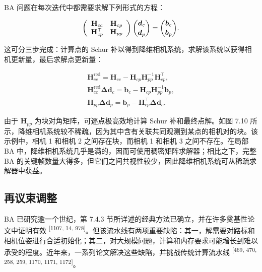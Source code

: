 BA 问题在每次迭代中都需要求解下列形式的方程：

\begin{equation*}
\left( \begin{array}{c c} \mathbf {H} _ {c c} & \mathbf {H} _ {c p} \\ \mathbf {H} _ {c p} ^ {\top} & \mathbf {H} _ {p p} \end{array} \right) \binom{\boldsymbol {d} _ {c}}{\boldsymbol {d} _ {p}} = \binom{\boldsymbol {b} _ {c}}{\boldsymbol {b} _ {p}}.
\end{equation*}

这可分三步完成：计算点的 Schur 补以得到降维相机系统，求解该系统以获得相机更新量，最后求解点更新量：

\begin{equation}
\begin{array}{r}
\mathbf {H} _ {c c} ^ {\mathrm{red}} = \mathbf {H} _ {c c} - \mathbf {H} _ {c p} \mathbf {H} _ {p p} ^ {- 1} \mathbf {H} _ {c p} ^ {\top}, \\
\mathbf {H} _ {c c} ^ {\mathrm{red}} \mathbf {\Delta} \boldsymbol {d} _ {c} = \boldsymbol {b} _ {c} - \mathbf {H} _ {c p} \mathbf {H} _ {p p} ^ {- 1} \boldsymbol {b} _ {p}, \\
\mathbf {H} _ {p p} \mathbf {\Delta} \boldsymbol {d} _ {p} = \boldsymbol {b} _ {p} - \mathbf {H} _ {c p} ^ {\top} \mathbf {\Delta} \boldsymbol {d} _ {c}.
\end{array}\tag{7.7}
\end{equation}

由于 $\mathbf { H } _ { p p }$ 为块对角矩阵，可逐点极高效地计算 Schur 补和最终点解。如图 7.10 所示，降维相机系统较不稀疏，因为其中含有关联共同观测到某点的相机对的块。该示例中，相机 1 和相机 2 之间存在块，而相机 1 和相机 3 之间不存在。在局部 BA 中，降维相机系统几乎是满的，因而可使用稠密矩阵求解器；相比之下，完整 BA 的关键帧数量大得多，但它们之间共视性较少，因此降维相机系统可从稀疏求解器中获益。

\subsection{再议束调整}

BA 已研究逾一个世纪，第 7.4.3 节所详述的经典方法已确立，并在许多奠基性论文中证明有效 \textsuperscript{[1107, 14, 978]}。但该流水线有两项重要缺陷：其一，解需要对路标和相机位姿进行合适初始化；其二，对大规模问题，计算和内存要求可能增长到难以承受的程度。近年来，一系列论文解决这些缺陷，并挑战传统计算流水线 \textsuperscript{[469, 470, 258, 259, 1170, 1171, 1172]}。

